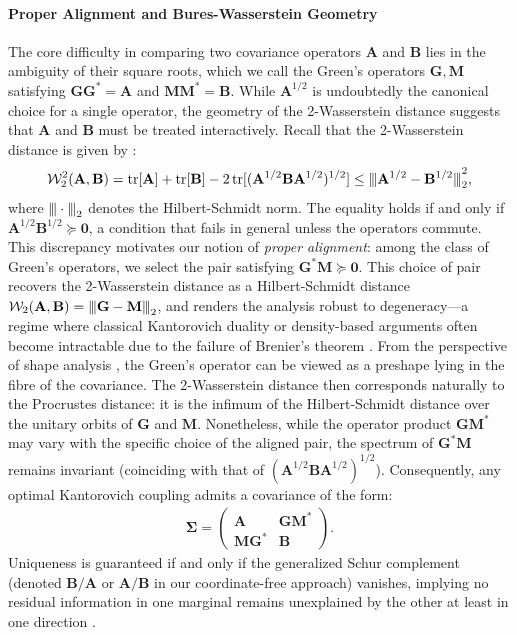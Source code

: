 \documentclass[noinfoline]{imsart}\setcounter{tocdepth}{2}
\newcommand{\m}[1]{\mathbf{#1}}
\renewcommand{\c}[1]{\mathcal{#1}}
\DeclareMathOperator{\tr}{tr}
\newcommand{\vertii}[1]{{\vert\kern-0.25ex\vert\kern-0.25ex\vert #1 
    \vert\kern-0.25ex\vert\kern-0.25ex\vert}} %
\theoremstyle{plain}
\begin{document}
\paragraph{Proper Alignment and Bures-Wasserstein Geometry} 
The core difficulty in comparing two covariance operators $\m{A}$ and $\m{B}$ lies in the ambiguity of their square roots, which we call the Green's operators $\m{G}, \m{M}$ satisfying $\m{G} \m{G}^{*} = \m{A}$ and $\m{M} \m{M}^{*} = \m{B}$. While $\m{A}^{1/2}$ is undoubtedly the canonical choice for a single operator, the geometry of the 2-Wasserstein distance suggests that $\m{A}$ and $\m{B}$ must be treated interactively. Recall that the 2-Wasserstein distance is given by \cite{gelbrich1990formula, bhatia2019bures, takatsu2011wasserstein, panaretos2020invitation}:
\begin{align*}
    \c{W}_{2}^{2}(\m{A}, \m{B}) = \tr [\m{A}] + \tr [\m{B}] - 2 \tr [(\m{A}^{1/2} \m{B} \m{A}^{1/2})^{1/2}] \le \vertii{\m{A}^{1/2} - \m{B}^{1/2}}_{2}^{2},
\end{align*}
where $\vertii{\cdot}_{2}$ denotes the Hilbert-Schmidt norm. The equality holds if and only if $\m{A}^{1/2} \m{B}^{1/2} \succeq \m{0}$, a condition that fails in general unless the operators commute. This discrepancy motivates our notion of \textit{proper alignment}: among the class of Green's operators, we select the pair satisfying $\m{G}^{*} \m{M} \succeq \m{0}$. This choice of pair recovers the 2-Wasserstein distance as a Hilbert-Schmidt distance $\c{W}_{2}(\m{A}, \m{B}) = \vertii{\m{G} - \m{M}}_{2}$, and renders the analysis robust to degeneracy—a regime where classical Kantorovich duality or density-based arguments often become intractable due to the failure of Brenier's theorem \cite{villani2008optimal, villani2021topics, yun2025gaussian}. From the perspective of shape analysis \cite{dryden2016statistical, pigoli2014distances, masarotto2019procrustes}, the Green's operator can be viewed as a preshape lying in the fibre of the covariance. The 2-Wasserstein distance then corresponds naturally to the Procrustes distance: it is the infimum of the Hilbert-Schmidt distance over the unitary orbits of $\m{G}$ and $\m{M}$. Nonetheless, while the operator product $\m{G} \m{M}^{*}$ may vary with the specific choice of the aligned pair, the spectrum of $\m{G}^{*} \m{M}$ remains invariant (coinciding with that of $(\m{A}^{1/2} \m{B} \m{A}^{1/2})^{1/2}$). Consequently, any optimal Kantorovich coupling admits a covariance of the form:
\begin{align*}
    \m{\Sigma} = \left(
    \begin{array}{c|c}
    \m{A} & \m{G} \m{M}^* \\
    \hline
    \m{M} \m{G}^* & \m{B}
    \end{array}
    \right).
\end{align*}
Uniqueness is guaranteed if and only if the generalized Schur complement (denoted $\m{B}/\m{A}$ or $\m{A}/\m{B}$ in our coordinate-free approach) vanishes, implying no residual information in one marginal remains unexplained by the other at least in one direction \cite{yun2025gaussian}.
\end{document}

